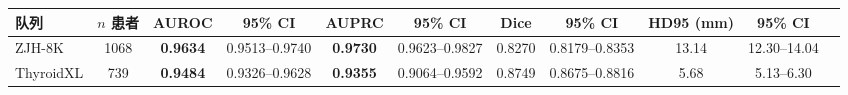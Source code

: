 \begin{responsetable}
\caption{}
\label{tab_patient_seg}
\begin{adjustbox}{max width=\textwidth,center}
\small
\begin{tabular}{lcccccccccc}
\toprule
队列 & $n$ 患者 & AUROC & 95\% CI & AUPRC & 95\% CI & Dice & 95\% CI & HD95 (mm) & 95\% CI \\
\midrule
ZJH-8K & 1068 & \textbf{0.9634} & 0.9513–0.9740 & \textbf{0.9730} & 0.9623–0.9827 & 0.8270 & 0.8179–0.8353 & 13.14 & 12.30–14.04 \\
ThyroidXL & 739 & \textbf{0.9484} & 0.9326–0.9628 & \textbf{0.9355} & 0.9064–0.9592 & 0.8749 & 0.8675–0.8816 & 5.68 & 5.13–6.30 \\
\bottomrule
\end{tabular}
\end{adjustbox}
\end{responsetable}

